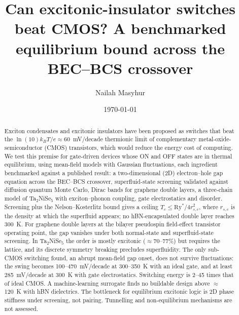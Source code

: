 \documentclass[aip,jap,reprint,amsmath,amssymb]{revtex4-2}
\begin{document}
\title{Can excitonic-insulator switches beat CMOS? A benchmarked equilibrium bound across the BEC--BCS crossover}

\author{Nailah Masyhur}

\date{\today}

\begin{abstract}
Exciton condensates and excitonic insulators have been proposed as switches that beat the $\ln(10)k_BT/e \approx 60$~mV/decade thermionic limit of complementary metal-oxide-semiconductor (CMOS) transistors, which would reduce the energy cost of computing. We test this premise for gate-driven devices whose ON and OFF states are in thermal equilibrium, using mean-field models with Gaussian fluctuations, each ingredient benchmarked against a published result: a two-dimensional (2D) electron--hole gap equation across the BEC--BCS crossover, superfluid-state screening validated against diffusion quantum Monte Carlo, Dirac bands for graphene double layers, a three-chain model of Ta$_2$NiSe$_5$ with exciton--phonon coupling, gate electrostatics and disorder. Screening plus the Nelson--Kosterlitz bound gives a ceiling $T_c \le \mathrm{Ry}^*/4r_{s,c}^2$, where $r_{s,c}$ is the density at which the superfluid appears; no hBN-encapsulated double layer reaches 300~K. For graphene double layers at the bilayer pseudospin field-effect transistor operating point, the gap vanishes under both normal-state and superfluid-state screening. In Ta$_2$NiSe$_5$ the order is mostly excitonic ($\approx$70--77\%) but requires the lattice, and its discrete symmetry breaking precludes superfluidity. The only sub-CMOS switching found, an abrupt mean-field gap onset, does not survive fluctuations: the swing becomes 100--470~mV/decade at 300--350~K with an ideal gate, and at least 285~mV/decade at 300~K with gate electrostatics. Switching energy is 2--45 times that of ideal CMOS. A machine-learning surrogate finds no buildable design above $\approx$120~K with hBN dielectrics. The bottleneck for equilibrium excitonic logic is 2D phase stiffness under screening, not pairing. Tunnelling and non-equilibrium mechanisms are not assessed.
\end{abstract}

\maketitle
\end{document}
